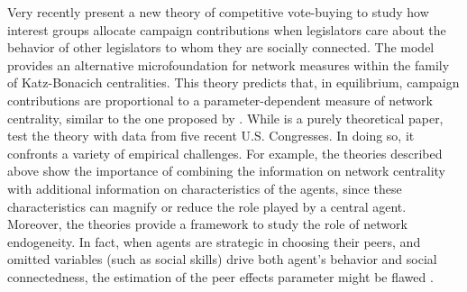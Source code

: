 \documentclass[nojss]{jss}
\begin{document}
Very recently \cite{Battaglini+Patacchini:2018} present a new theory of competitive vote-buying to study how interest groups allocate campaign contributions when legislators care about the behavior of other legislators to whom they are socially connected. The model provides an alternative microfoundation for network measures within the family of Katz-Bonacich centralities. This theory predicts that, in equilibrium, campaign contributions are proportional to a parameter-dependent measure of network centrality, similar to the one proposed by \cite{Ballester+Armengol+Zenou:2006}. While \cite{Ballester+Armengol+Zenou:2006} is a purely theoretical paper, \cite{Battaglini+Patacchini:2018} test the theory with data from five recent U.S. Congresses. In doing so, it confronts a variety of empirical challenges. For example, the theories described above show the importance of combining the information on network centrality with additional information on characteristics of the agents, since these characteristics can magnify or reduce the role played by a central agent. Moreover, the theories provide a framework to study the role of network endogeneity. In fact, when agents are strategic in choosing their peers, and omitted variables (such as social skills) drive both agent's behavior and social connectedness, the estimation of the peer effects parameter might be flawed \citep{Manski:1993}.
\end{document}
